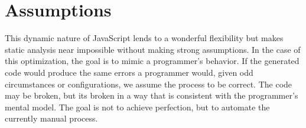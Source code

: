 \section{Assumptions}

This dynamic nature of JavaScript lends to a wonderful flexibility but makes static analysis near impossible without making strong assumptions.  In the case of this optimization, the goal is to mimic a programmer's behavior.  If the generated code would produce the same errors a programmer would, given odd circumstances or configurations, we assume the process to be correct.  The code may be broken, but its broken in a way that is consistent with the programmer's mental model.  The goal is not to achieve perfection, but to automate the currently manual process.  



